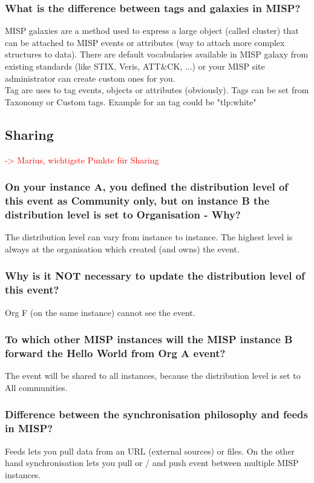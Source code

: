 \subsubsection{What is the difference between tags and galaxies in MISP?}
MISP galaxies are a method used to express a large object (called cluster) that can be attached to MISP events or attributes (way to attach more complex structures to data). There are default vocabularies available in MISP galaxy from existing standards (like STIX, Veris, ATT\&CK, ...) or your MISP site administrator can create custom ones for you.\\

Tag are uses to tag events, objects or attributes (obviously). Tags can be set from Taxonomy or Custom tags. Example for an tag could be "tlp:white"

\subsection{Sharing}

\textcolor{red}{-> Marius, wichtigste Punkte für Sharing}

\subsubsection{On your instance A, you defined the distribution level of this event as Community only, but on instance B the distribution level is set to Organisation - Why?}
The distribution level can vary from instance to instance. The highest level is always at the organisation which created (and owns) the event.

\subsubsection{Why is it NOT necessary to update the distribution level of this event?}
Org F (on the same instance) cannot see the event.

\subsubsection{To which other MISP instances will the MISP instance B forward the Hello World from Org A event?}
The event will be shared to all instances, because the distribution level is set to All communities.

\subsubsection{Difference between the synchronisation philosophy and feeds in MISP?}
Feeds lets you pull data from an URL (external sources) or files. On the other hand synchronisation lets you pull or / and push event between multiple MISP instances.

